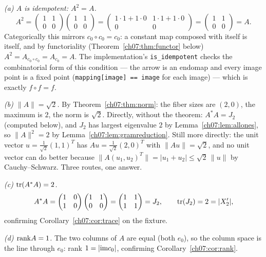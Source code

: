 \emph{(a) $A$ is idempotent: $A^2=A$.}
\[
A^2=\begin{pmatrix}1&1\\0&0\end{pmatrix}\begin{pmatrix}1&1\\0&0\end{pmatrix}
=\begin{pmatrix}1\cdot 1+1\cdot 0 & 1\cdot 1+1\cdot 0\\ 0&0\end{pmatrix}
=\begin{pmatrix}1&1\\0&0\end{pmatrix}=A .
\]
Categorically this mirrors $c_0\circ c_0=c_0$: a constant map composed with
itself is itself, and by functoriality
(Theorem~\ref{ch07:thm:functor} below) $A^2=A_{c_0\circ c_0}=A_{c_0}=A$.
The implementation's \texttt{is\_idempotent} checks the combinatorial form
of this condition --- the arrow is an endomap and every image point is a
fixed point (\texttt{mapping[image] == image} for each image) --- which is
exactly $f\circ f=f$.

\emph{(b) $\lVert A\rVert=\sqrt{2}$.} By Theorem~\ref{ch07:thm:norm}: the
fiber sizes are $(2,0)$, the maximum is $2$, the norm is $\sqrt 2$.
Directly, without the theorem: $A^*A=J_2$ (computed below), and
$J_2$ has largest eigenvalue $2$ by Lemma~\ref{ch07:lem:allones}, so
$\lVert A\rVert^2=2$ by Lemma~\ref{ch07:lem:gramreduction}. Still more
directly: the unit vector $u=\tfrac{1}{\sqrt2}(1,1)^T$ has
$Au=\tfrac{1}{\sqrt2}(2,0)^T$ with $\lVert Au\rVert=\sqrt2$, and no unit
vector can do better because
$\lVert A(u_1,u_2)^T\rVert=|u_1+u_2|\le\sqrt{2}\,\lVert u\rVert$ by
Cauchy--Schwarz. Three routes, one answer.

\emph{(c) $\mathrm{tr}(A^*A)=2$.}
\[
A^{*}A=\begin{pmatrix}1&0\\1&0\end{pmatrix}
\begin{pmatrix}1&1\\0&0\end{pmatrix}
=\begin{pmatrix}1&1\\1&1\end{pmatrix}=J_2,
\qquad \mathrm{tr}(J_2)=2=|X_2'| ,
\]
confirming Corollary~\ref{ch07:cor:trace} on the fixture.

\emph{(d) $\mathrm{rank} A=1$.} The two columns of $A$ are equal (both $e_0$), so the
column space is the line through $e_0$: rank $1=|\mathrm{im} c_0|$, confirming
Corollary~\ref{ch07:cor:rank}.

